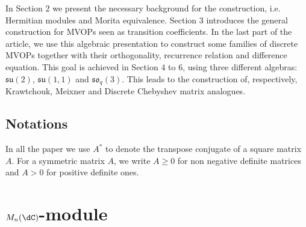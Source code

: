 \documentclass[a4paper,reqno]{amsart}
\theoremstyle{definition}
\numberwithin{equation}{section}
\begin{document}
In Section $2$ we present the necessary background for the construction, i.e. Hermitian modules and Morita equivalence.  Section $3$ introduces the general construction for MVOPs seen as transition coefficients. In the last part of the article, we use this algebraic presentation to construct some families of discrete MVOPs together with their orthogonality, recurrence relation and difference equation. This goal is achieved in Section $4$ to $6$, using three different algebras: $\mathfrak{su}(2)$, $\mathfrak{su}(1,1)$ and $\mathfrak{so}_q(3)$. This leads to the construction of, respectively, Krawtchouk, Meixner and Discrete Chebyshev matrix analogues. 





\subsection{Notations} In all the paper we use $A^*$ to denote the transpose conjugate of a square matrix $A$. For a symmetric matrix $ A$, we write $A \geq 0$ for non negative definite matrices and $A>0$ for positive definite ones.



\section{$M_n(\dC)$-module}
\end{document}
